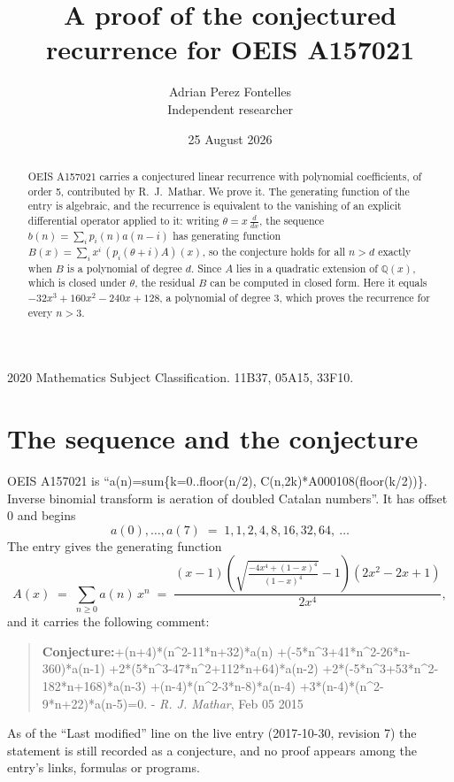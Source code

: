 \documentclass[11pt,a4paper]{article}
\title{A proof of the conjectured recurrence for OEIS A157021}
\author{Adrian Perez Fontelles\\ \small Independent researcher}
\date{25 August 2026}
\theoremstyle{plain}
\theoremstyle{definition}
\begin{document}
\maketitle

\begin{abstract}
OEIS A157021 carries a conjectured linear recurrence with polynomial coefficients, of
order 5, contributed by R.~J.~Mathar. We prove it. The generating function of the
entry is algebraic, and the recurrence is equivalent to the vanishing of an explicit
differential operator applied to it: writing $\theta=x\,\frac{d}{dx}$, the sequence
$b(n)=\sum_{i}p_{i}(n)a(n-i)$ has generating function
$B(x)=\sum_{i}x^{i}\,(p_{i}(\theta+i)A)(x)$, so the conjecture holds for all $n>d$ exactly
when $B$ is a polynomial of degree $d$. Since $A$ lies in a quadratic extension of
$\mathbb{Q}(x)$, which is closed under $\theta$, the residual $B$ can be computed in
closed form. Here it equals $- 32 x^{3} + 160 x^{2} - 240 x + 128$, a polynomial of degree $3$, which proves
the recurrence for every $n>3$.
\end{abstract}

\noindent\small 2020 Mathematics Subject Classification. 11B37, 05A15, 33F10.\normalsize

\section{The sequence and the conjecture}

OEIS A157021 is ``a(n)=sum\{k=0..floor(n/2), C(n,2k)*A000108(floor(k/2))\}. Inverse binomial transform is aeration of doubled Catalan numbers''. It has offset $0$ and begins
\[
a(0),\dots,a(7)\;=\;1, 1, 2, 4, 8, 16, 32, 64,\ \dots
\]
The entry gives the generating function
\begin{equation}\label{eq:gf}
A(x)\;=\;\sum_{n\ge 0} a(n)\,x^{n}\;=\;\frac{\left(x - 1\right) \left(\sqrt{\frac{- 4 x^{4} + \left(1 - x\right)^{4}}{\left(1 - x\right)^{4}}} - 1\right) \left(2 x^{2} - 2 x + 1\right)}{2 x^{4}} ,
\end{equation}
and it carries the following comment:
\begin{quote}\small
\textbf{Conjecture:}+(n+4)*(n\^{}2-11*n+32)*a(n) +(-5*n\^{}3+41*n\^{}2-26*n-360)*a(n-1) +2*(5*n\^{}3-47*n\^{}2+112*n+64)*a(n-2) +2*(-5*n\^{}3+53*n\^{}2-182*n+168)*a(n-3) +(n-4)*(n\^{}2-3*n-8)*a(n-4) +3*(n-4)*(n\^{}2-9*n+22)*a(n-5)=0. - \emph{R. J. Mathar}, Feb 05 2015
\end{quote}
As of the ``Last modified'' line on the live entry (2017-10-30, revision 7) the
statement is still recorded as a conjecture, and no proof appears among the entry's links,
formulas or programs.
\end{document}
